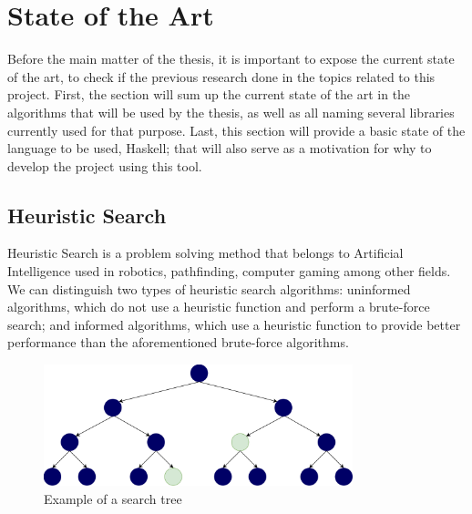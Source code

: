 \section{State of the Art}

Before the main matter of the thesis, it is important to expose the current
state of the art, to check if the previous research done in the topics
related to this project. First, the section will sum up the current state of
the art in the algorithms that will be used by the thesis, as well as all
naming several libraries currently used for that purpose. Last, this section
will provide a basic state of the language to be used, Haskell; that will also
serve as a motivation for why to develop the project using this tool.\\

\subsection{Heuristic Search}

Heuristic Search is a problem solving method that belongs to Artificial
Intelligence \cite{rusell-2003-aima} used in robotics, pathfinding, computer
gaming among other fields. We can distinguish two types of heuristic search
algorithms: uninformed algorithms, which do not use a heuristic function and
perform a brute-force search; and informed algorithms, which use a heuristic
function to provide better performance than the aforementioned brute-force
algorithms.\\

\begin{figure}[ht]
\centering
\includegraphics[width=0.8\textwidth]{img/empty-tree.png}
\caption{Example of a search tree}
\label{tree:empty}
\end{figure}

